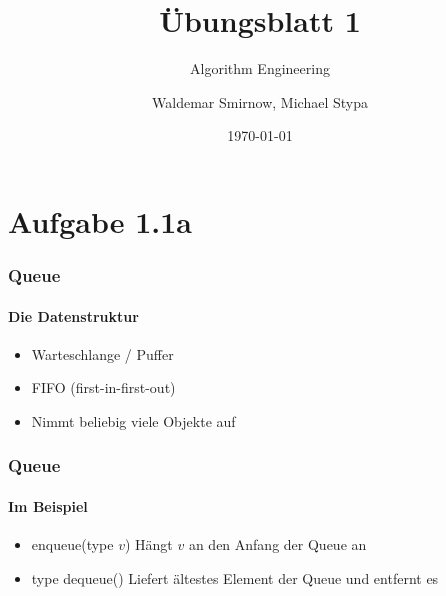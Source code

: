 \documentclass[handout]{beamer}
\title{Übungsblatt 1}
\subtitle{Algorithm Engineering}
\author{Waldemar Smirnow, Michael Stypa}
\institute{Universität Osnabrück}
\date{\today}
\begin{document}
\begin{frame}
    \titlepage
\end{frame}


\section{Aufgabe 1.1a}
\begin{frame}
  \frametitle{Queue}
  \framesubtitle{Die Datenstruktur}
  \begin{itemize}
    \item Warteschlange / Puffer
    \item FIFO (first-in-first-out)
    \item Nimmt beliebig viele Objekte auf
  \end{itemize}
\end{frame}

\begin{frame}
  \frametitle{Queue}
  \framesubtitle{Im Beispiel}
  \begin{figure}
    \centering
  \end{figure}
  \begin{itemize}
    \item<2-> enqueue(type $v$) Hängt $v$ an den Anfang der Queue an
    \item<3-> type dequeue() Liefert ältestes Element der Queue und entfernt es
  \end{itemize}
\end{frame}
\end{document}
